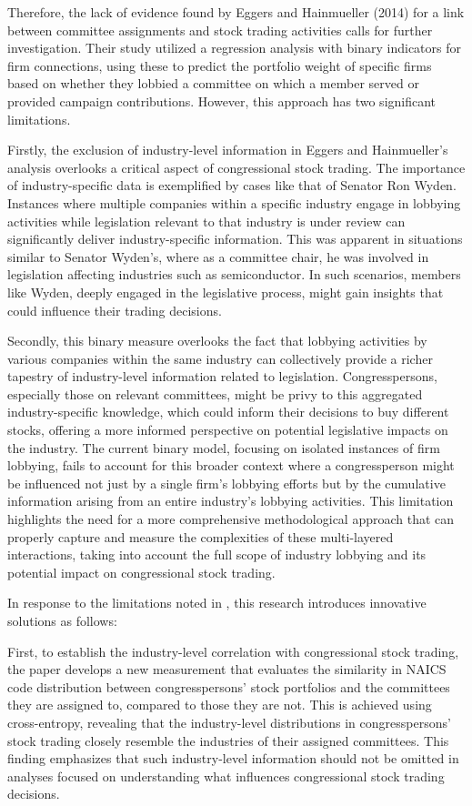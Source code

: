 \documentclass[15pt,letterpaper]{article}
\begin{document}
Therefore, the lack of evidence found by Eggers and Hainmueller (2014) for a link between committee assignments and stock trading activities calls for further investigation. Their study utilized a regression analysis with binary indicators for firm connections, using these to predict the portfolio weight of specific firms based on whether they lobbied a committee on which a member served or provided campaign contributions. However, this approach has two significant limitations.

Firstly, the exclusion of industry-level information in Eggers and Hainmueller's analysis overlooks a critical aspect of congressional stock trading. The importance of industry-specific data is exemplified by cases like that of Senator Ron Wyden. Instances where multiple companies within a specific industry engage in lobbying activities while legislation relevant to that industry is under review can significantly deliver industry-specific information. This was apparent in situations similar to Senator Wyden's, where as a committee chair, he was involved in legislation affecting industries such as semiconductor. In such scenarios, members like Wyden, deeply engaged in the legislative process, might gain insights that could influence their trading decisions. 

Secondly, this binary measure overlooks the fact that lobbying activities by various companies within the same industry can collectively provide a richer tapestry of industry-level information related to legislation. Congresspersons, especially those on relevant committees, might be privy to this aggregated industry-specific knowledge, which could inform their decisions to buy different stocks, offering a more informed perspective on potential legislative impacts on the industry. The current binary model, focusing on isolated instances of firm lobbying, fails to account for this broader context where a congressperson might be influenced not just by a single firm's lobbying efforts but by the cumulative information arising from an entire industry’s lobbying activities. This limitation highlights the need for a more comprehensive methodological approach that can properly capture and measure the complexities of these multi-layered interactions, taking into account the full scope of industry lobbying and its potential impact on congressional stock trading.

In response to the limitations noted in \cite{eg14}, this research introduces innovative solutions as follows:

First, to establish the industry-level correlation with congressional stock trading, the paper develops a new measurement that evaluates the similarity in NAICS code distribution between congresspersons' stock portfolios and the committees they are assigned to, compared to those they are not. 
This is achieved using cross-entropy, revealing that the industry-level distributions in congresspersons' stock trading closely resemble the industries of their assigned committees. 
This finding emphasizes that such industry-level information should not be omitted in analyses focused on understanding what influences congressional stock trading decisions.
\end{document}
